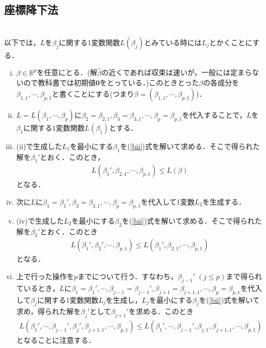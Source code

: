 \documentclass{jsarticle}
\theoremstyle{definition}
\theoremstyle{mystyle} %
\begin{document}
\subsection*{座標降下法}\mbox{}\\
以下では，$L$を$\beta_j$に関する1変数関数$L(\beta_j)$とみている時には$L_j$とかくことにする．
\begin{enumerate}[(i)]
\item $\beta\in\mathbb{R}^p$を任意にとる．(解$\hat{\beta}$の近くであれば収束は速いが，一般には定まらないので教科書では初期値${\bm 0}$をとっている．)このときとった$\beta$の各成分を$\beta_{1,1},\cdots,\beta_{p,1}$と書くことにする(つまり$\beta=(\beta_{1,1},\cdots,\beta_{p,1})$)．\\

\item $L=L(\beta_1,\cdots,\beta_p)$に$\beta_2=\beta_{2,1},\beta_3 = \beta_{3,1},\cdots,\beta_p=\beta_{p,1}$を代入することで，$L$を$\beta_1$に関する$1$変数関数$L(\beta_1)$とする．\\

\item (ii)で生成した$L_1$を最小にする$\beta_1$を(\ref{bii})式を解いて求める．そこで得られた解を$\beta_1'$とおく．このとき，
\begin{align}
\label{ichi}
L(\beta_1',\beta_{2,1},\cdots,\beta_{p,1})\leq L(\beta)
\end{align}
となる．\\

\item 次に$L$に$\beta_1=\beta_1',\beta_3 = \beta_{3,1},\cdots,\beta_p=\beta_{p,1}$を代入して1変数$L_2$を生成する．\\

\item (iv)で生成した$L_2$を最小にする$\beta_2$を(\ref{bii})式を解いて求める．そこで得られた解を$\beta_2'$とおく．このとき
\begin{align}
\label{nii}
L(\beta_1',\beta_2',\cdots,\beta_{p,1})\leq L(\beta_1',\beta_{2,1},\cdots,\beta_{p,1})
\end{align}
となる．\\

\item 上で行った操作を$p$までについて行う．すなわち，$\beta_{j-1}'\;(j\leq p)$まで得られているとき，$L$に$\beta_1 = \beta_1',\cdots,\beta_{j-1}= \beta_{j-1}',\beta_{j+1}=\beta_{j+1,1},\cdots,\beta_p = \beta_{p,1}$を代入して$\beta_j$に関する1変数関数$L_j$を生成し，$L_j$を最小にする$\beta_j$を(\ref{bii})式を解いて求め，得られた解を$\beta_j'$として$\beta_{j+1}'$を求める．このとき
\begin{align}
\label{takussan}
L(\beta_1',\cdots,\beta_{j-1}',\beta_j',\beta_{j+1,1},\cdots,\beta_{p,1})\leq L(\beta_1',\cdots,\beta_{j-1}',\beta_{j,1},\beta_{j+1,1},\cdots,\beta_{p,1})
\end{align}
となることに注意する．


\end{enumerate}
\end{document}

